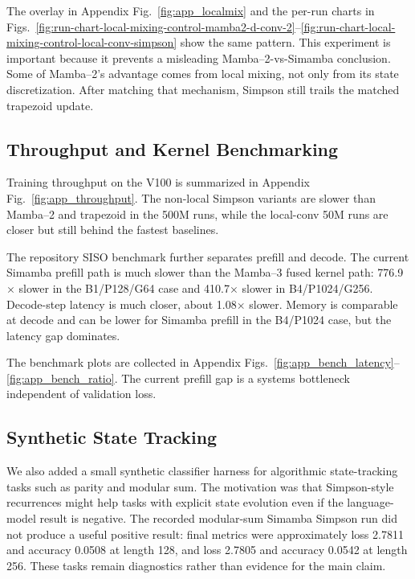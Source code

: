 \documentclass[conference]{IEEEtran}
\newcommand{\modelname}{Simamba\xspace}
\newcommand{\mambatwo}{Mamba--2\xspace}
\newcommand{\mambathree}{Mamba--3\xspace}
\begin{document}
The overlay in Appendix Fig.~\ref{fig:app_localmix} and the per-run charts in Figs.~\ref{fig:run-chart-local-mixing-control-mamba2-d-conv-2}--\ref{fig:run-chart-local-mixing-control-local-conv-simpson} show the same pattern. This experiment is important because it prevents a misleading \mambatwo-vs-\modelname conclusion. Some of \mambatwo's advantage comes from local mixing, not only from its state discretization. After matching that mechanism, Simpson still trails the matched trapezoid update.

\subsection{Throughput and Kernel Benchmarking}

Training throughput on the V100 is summarized in Appendix Fig.~\ref{fig:app_throughput}. The non-local Simpson variants are slower than \mambatwo and trapezoid in the 500M runs, while the local-conv 50M runs are closer but still behind the fastest baselines.

The repository SISO benchmark further separates prefill and decode. The current \modelname prefill path is much slower than the \mambathree fused kernel path: 776.9$\times$ slower in the B1/P128/G64 case and 410.7$\times$ slower in B4/P1024/G256. Decode-step latency is much closer, about 1.08$\times$ slower. Memory is comparable at decode and can be lower for \modelname prefill in the B4/P1024 case, but the latency gap dominates.

The benchmark plots are collected in Appendix Figs.~\ref{fig:app_bench_latency}--\ref{fig:app_bench_ratio}. The current prefill gap is a systems bottleneck independent of validation loss.

\subsection{Synthetic State Tracking}

We also added a small synthetic classifier harness for algorithmic state-tracking tasks such as parity and modular sum. The motivation was that Simpson-style recurrences might help tasks with explicit state evolution even if the language-model result is negative. The recorded modular-sum \modelname Simpson run did not produce a useful positive result: final metrics were approximately loss 2.7811 and accuracy 0.0508 at length 128, and loss 2.7805 and accuracy 0.0542 at length 256. These tasks remain diagnostics rather than evidence for the main claim.
\end{document}
